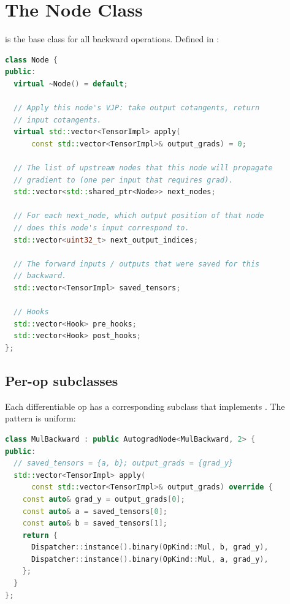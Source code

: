 \section{The Node Class}
\label{sec:autograd_engine:node}

 is the base class for all backward operations.
Defined in :

\begin{lstlisting}[style=lucidcpp,language=C++]
class Node {
public:
  virtual ~Node() = default;

  // Apply this node's VJP: take output cotangents, return
  // input cotangents.
  virtual std::vector<TensorImpl> apply(
      const std::vector<TensorImpl>& output_grads) = 0;

  // The list of upstream nodes that this node will propagate
  // gradient to (one per input that requires grad).
  std::vector<std::shared_ptr<Node>> next_nodes;

  // For each next_node, which output position of that node
  // does this node's input correspond to.
  std::vector<uint32_t> next_output_indices;

  // The forward inputs / outputs that were saved for this
  // backward.
  std::vector<TensorImpl> saved_tensors;

  // Hooks
  std::vector<Hook> pre_hooks;
  std::vector<Hook> post_hooks;
};
\end{lstlisting}

\subsection{Per-op subclasses}
\label{ssec:autograd_engine:per_op_subclass}

Each differentiable op has a corresponding  subclass
that implements . The pattern is uniform:

\begin{lstlisting}[style=lucidcpp,language=C++]
class MulBackward : public AutogradNode<MulBackward, 2> {
public:
  // saved_tensors = {a, b}; output_grads = {grad_y}
  std::vector<TensorImpl> apply(
      const std::vector<TensorImpl>& output_grads) override {
    const auto& grad_y = output_grads[0];
    const auto& a = saved_tensors[0];
    const auto& b = saved_tensors[1];
    return {
      Dispatcher::instance().binary(OpKind::Mul, b, grad_y),
      Dispatcher::instance().binary(OpKind::Mul, a, grad_y),
    };
  }
};
\end{lstlisting}

